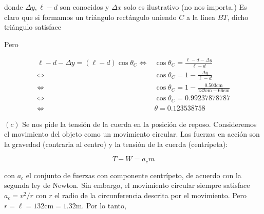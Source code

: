 \documentclass[12pt]{article}
\theoremstyle{definition}
\begin{document}
donde $\Delta y, \ell - d$ son conocidos y $\Delta x$ solo es ilustrativo (no
nos importa.) Es claro que si formamos un triángulo rectángulo uniendo $C$ a la
línea $BT$, dicho triángulo satisface


\begin{center}
\end{center}

Pero 

\begin{align*}
    \ell - d - \Delta y = (\ell - d)\cos \theta_C 
    \iff 
    &\cos \theta_C = \frac{\ell - d - \Delta y}{\ell - d} \\ 
    \iff ~ ~ ~ 
    &\cos \theta_C = 1 - \frac{\Delta y}{\ell - d} \\ 
    \iff  ~ ~ ~ 
    &\cos \theta_C = 1 - \frac{0.503\text{cm}}{132\text{cm} - 66\text{cm}} \\ 
    \iff ~ ~ ~ 
    &\cos \theta_C = 0.99237878787 \\ 
    \iff ~ ~ ~ 
    &\theta = 0.123538758
\end{align*}


$(c)$ Se nos pide la tensión de la cuerda en la posición de reposo. Consideremos
el movimiento del objeto como un movimiento circular. Las fuerzas en acción son
la gravedad (contraria al centro) y la tensión de la cuerda (centrípeta):

\begin{equation*}
    T - W = a_c m
\end{equation*}

con $a_c$ el conjunto de fuerzas con componente centrípeto, de acuerdo con la
segunda ley de Newton. Sin embargo, el movimiento circular siempre satisface
$a_c = v^2 / r$ con $r$ el radio de la circunferencia descrita por el
movimiento. Pero $r = \ell = 132\text{cm} = 1.32\text{m}$. Por lo tanto, 
\end{document}
